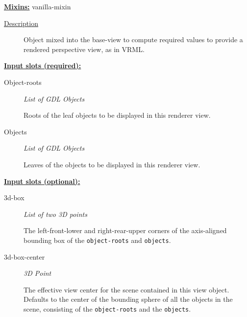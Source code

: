 \documentclass [11pt]{book}
\begin{document}
\begin{itemize}
\textbf{
\underline{Mixins:}} vanilla-mixin





\begin{description}

\item [
\underline{Description}]


Object mixed into the base-view to compute required values to provide
a rendered perspective view, as in VRML.



\end{description}








\textbf{
\underline{Input slots (required):}}

\begin{description}

\item [Object-roots]
\emph{List of GDL Objects}

 Roots of the leaf objects to be displayed in this renderer view.




\item [Objects]
\emph{List of GDL Objects}

 Leaves of the objects to be displayed in this renderer view.




\end{description}






\textbf{
\underline{Input slots (optional):}}

\begin{description}

\item [3d-box]
\emph{List of two 3D points}

 The left-front-lower and right-rear-upper corners of the axis-aligned bounding
box of the \texttt{object-roots} and \texttt{objects}.




\item [3d-box-center]
\emph{3D Point}

 The effective view center for the scene contained in this view object. Defaults to the center of the bounding sphere of all
the objects in the scene, consisting of the \texttt{object-roots} and the \texttt{objects}.





\end{description}
\end{itemize}
\end{document}
